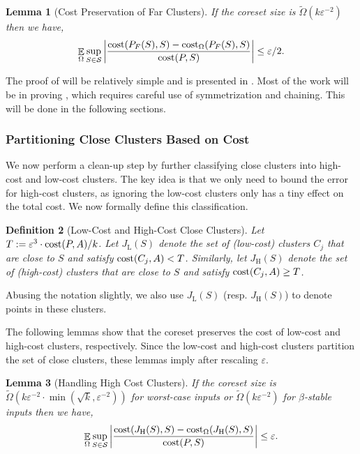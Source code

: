 \documentclass[11pt]{article}
\newtheorem{lemma}{Lemma}[section]
\newtheorem{definition}[lemma]{Definition}
\theoremstyle{restate}
\theoremstyle{definition}
\newcommand{\eps}{\ensuremath{\varepsilon}}
\newcommand{\E}{\mathop{\mathbb{E}}}
\newcommand{\cost}{\textnormal{cost}}
\newcommand{\costom}{\cost_\Omega} %
\newcommand{\lowc}[1]{J_{\text{L}}(#1)}
\newcommand{\highc}[1]{J_{\text{H}}(#1)}
\begin{document}
\begin{lemma}[Cost Preservation of Far Clusters]\label{lem: goal-far}
	If the coreset size is  $\tilde{\Omega}( k \eps^{-2})$ then we have,
	\begin{align*}
		\begin{split}
			\E_{ \Omega} \sup_{S \in \mathcal{S}} \left\lvert \frac{\cost(P_F(S),S) - \costom(P_F(S),S)}{\cost(P,S)} \right\rvert \leq \eps/2.
		\end{split}
	\end{align*}
\end{lemma}
 The proof of  will be relatively simple and is presented in . Most of the work will be in proving , which requires careful use of symmetrization and chaining. This will be done in the following sections.

\subsubsection{Partitioning Close Clusters Based on Cost}
\label{subsec: partitioning-close-points}
We now perform a clean-up step by further classifying close clusters into high-cost and low-cost clusters. The key idea is that we only need to bound the error for high-cost clusters, as ignoring the low-cost clusters only has a tiny effect on the total cost. We now formally define this classification.

 \begin{definition}[Low-Cost and High-Cost Close Clusters]
       Let $T := \eps^3 \cdot \cost(P,A)/k$.
 Let $\lowc{S}$ denote the set of (low-cost) clusters $C_j$ that are close to $S$ and satisfy $\cost(C_j, A) < T$. Similarly, let $\highc{S}$ denote the set of (high-cost) clusters that are close to $S$ and satisfy $\cost(C_j, A) \geq T$. 
 \end{definition}
 Abusing the notation slightly, we also use $\lowc{S}$ (resp. $\highc{S}$) to denote points in these clusters.

The following lemmas show that the coreset preserves the cost of low-cost and high-cost clusters, respectively. Since the low-cost and high-cost clusters partition the set of close clusters,  these lemmas imply  after rescaling $\eps$.


\begin{lemma}[Handling High Cost Clusters]\label{lem: high-cluster}
If the coreset size is ${\tilde{\Omega}(k \eps^{-2} \cdot \min (\sqrt{k}, \eps^{-2}))}$ for worst-case inputs or $ \tilde{\Omega}(k \eps^{-2})$ for $\beta$-stable inputs then we have,
\begin{align}\label{eq: high-cost-cluster}
    \E_{ \Omega} \sup_{S \in \mathcal{S}} \left\lvert \frac{\cost(\highc{S}, S) - \costom(\highc{S},S)}{\cost(P,S) } \right\rvert \leq \eps.
\end{align}
\end{lemma}
\end{document}
